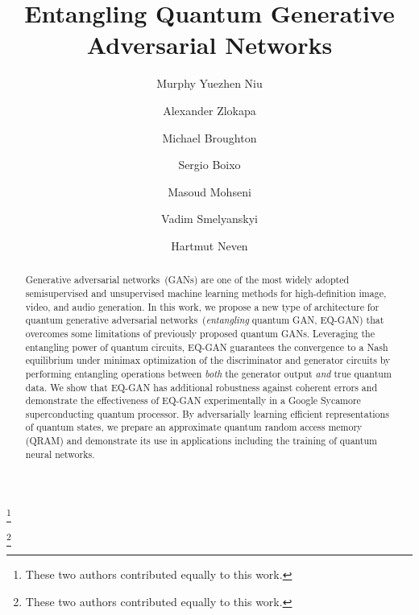 \documentclass[prl,superscriptaddress,twocolumn]{revtex4}
\theoremstyle{plain}
\theoremstyle{definition}
\begin{document}
\title{Entangling Quantum Generative Adversarial Networks }

\author{Murphy Yuezhen Niu}
\thanks{These two authors contributed equally to this work.}

\author{Alexander Zlokapa}
\thanks{These two authors contributed equally to this work.}

\author{Michael Broughton}

\author{Sergio Boixo}

\author{Masoud Mohseni}

\author{Vadim Smelyanskyi}

\author{Hartmut Neven}
  
  
\begin{abstract}
Generative adversarial networks~(GANs) are one of the most widely adopted semisupervised and unsupervised machine learning methods for high-definition image, video, and audio generation.
In this work, we propose a new type of architecture for quantum generative adversarial networks~(\emph{entangling} quantum GAN, EQ-GAN) that overcomes some limitations of previously proposed quantum GANs. Leveraging the entangling power of quantum circuits, EQ-GAN guarantees the convergence to a Nash equilibrium under minimax optimization of the discriminator and generator circuits by performing entangling operations between \textit{both} the generator output \textit{and} true quantum data. We show that EQ-GAN has additional robustness against coherent errors and demonstrate the effectiveness of EQ-GAN experimentally in a Google Sycamore superconducting quantum processor. By adversarially learning efficient representations of quantum states, we prepare an approximate quantum random access memory (QRAM) and demonstrate its use in applications including the  training of quantum neural networks.
\end{abstract}


\maketitle
\end{document}
